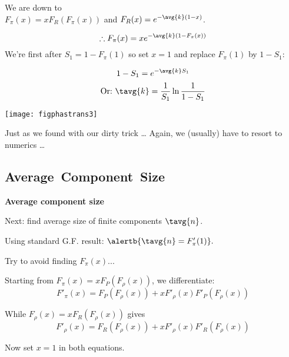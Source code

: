 \begin{frame}[label=]
\begin{frame}[label=]
\begin{frame}[label=]
\begin{frame}[label=]
\begin{frame}[label=]
\begin{frame}[label=]
\begin{frame}[label=]
\begin{frame}[label=]
\begin{frame}[label=]
\begin{frame}[label=]
\begin{frame}[label=]
\begin{frame}[label=rn-sneakyresult1]
\begin{frame}[label=]
\begin{frame}[label=]
\begin{frame}[label=rn-sneakyresult2]
\begin{frame}[label=]
\begin{frame}[label=]
\begin{frame}[label=]
\begin{frame}[label=]
\begin{frame}[label=]
\begin{frame}[label=]
\begin{frame}[label=]
\begin{frame}[label=]
    We are down to\\
    $
    F_\pi(x) = x F_R(F_\pi(x))
    $
    and
    $
    F_R(x) = e^{-\avg{k}(1-x)}
    $.
  
    $$
    \therefore
    F_\pi(x) = x e^{-\avg{k}(1-F_\pi(x))}
    $$
   We're first after $S_1 = 1 - F_\pi(1)$ so set $x=1$
    and replace $F_\pi(1)$ by $1-S_1$:
          
      {
        $$ 1 - S_1  = e^{-\avg{k}S_1} $$
      }
      {
        $$ \mbox{Or:\ } \tavg{k} = \frac{1}{S_1} \ln \frac{1}{1-S_1} $$
      }
      
              
        
        \texttt{[image: figphastrans3]}
            
       Just as we found with our dirty trick \ldots
   Again, we (usually) have to resort to numerics \ldots
  


\subsection{Average\ Component\ Size}

\begin{frame}[label=]
  \textbf{Average component size}

  
   Next: find \alert{average size} of finite components $\tavg{n}$.
   
    Using standard G.F. result:
    $
    \alertb{\tavg{n} = F'_\pi(1)}.
    $
   
    Try to avoid finding $F_\pi(x)$...
   
    Starting from 
    $
    F_{\pi}(x)
    =
    x
    F_{P}
    \left(
      F_{\rho} (x)
    \right)
    $, 
    we differentiate:
    $$
    F'_{\pi}(x)
    =
    F_{P}
    \left(
      F_{\rho} (x)
    \right)
    +    
    x
    F'_{\rho} (x)
    F'_{P}
    \left(
      F_{\rho} (x)
    \right)
    $$
   
    While
    $
    F_{\rho}(x)
    =
    x
    F_{R}
    \left(
      F_{\rho} (x)
    \right)
    $
    gives
    $$
    F'_{\rho}(x)
    =
    F_{R}
    \left(
      F_{\rho} (x)
    \right)
    +   
    x
    F'_{\rho} (x)
    F'_{R}
    \left(
      F_{\rho} (x)
    \right)
    $$
  
    Now set $x=1$ in both equations.
  

\end{frame}
\end{frame}
\end{frame}
\end{frame}
\end{frame}
\end{frame}
\end{frame}
\end{frame}
\end{frame}
\end{frame}
\end{frame}
\end{frame}
\end{frame}
\end{frame}
\end{frame}
\end{frame}
\end{frame}
\end{frame}
\end{frame}
\end{frame}
\end{frame}
\end{frame}
\end{frame}
\end{frame}
